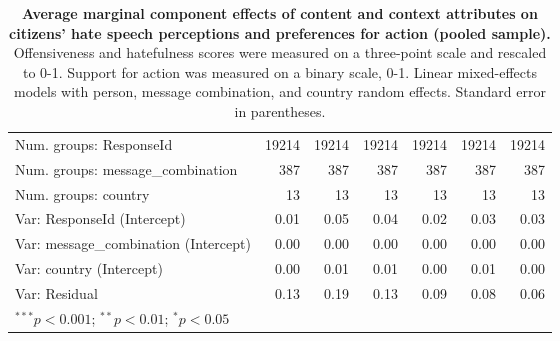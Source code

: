 \begin{table}
\begin{center}
\begin{tiny}
\begin{tabular}{l@{} D{.}{.}{6.4}@{} D{.}{.}{6.4}@{} D{.}{.}{6.4}@{} D{.}{.}{6.4}@{} D{.}{.}{6.5}@{} D{.}{.}{6.3}@{}}
Num. groups: ResponseId               & 19214     & 19214     & 19214     & 19214     & 19214      & 19214    \\
Num. groups: message\_combination     & 387       & 387       & 387       & 387       & 387        & 387      \\
Num. groups: country                  & 13        & 13        & 13        & 13        & 13         & 13       \\
Var: ResponseId (Intercept)           & 0.01      & 0.05      & 0.04      & 0.02      & 0.03       & 0.03     \\
Var: message\_combination (Intercept) & 0.00      & 0.00      & 0.00      & 0.00      & 0.00       & 0.00     \\
Var: country (Intercept)              & 0.00      & 0.01      & 0.01      & 0.00      & 0.01       & 0.00     \\
Var: Residual                         & 0.13      & 0.19      & 0.13      & 0.09      & 0.08       & 0.06     \\
\hline
{}
\end{tabular}
\end{tiny}
\caption{\textbf{Average marginal component effects of content and context attributes on citizens' hate speech perceptions and preferences for action \textcolor{colorpooled}{(pooled sample)}.} Offensiveness and hatefulness scores were measured on a three-point scale and rescaled to 0-1. Support for action was measured on a binary scale, 0-1. Linear mixed-effects models with person, message combination, and country random effects. Standard error in parentheses.}
\label{tab:acme-content-pooled}
\end{center}
\end{table}
